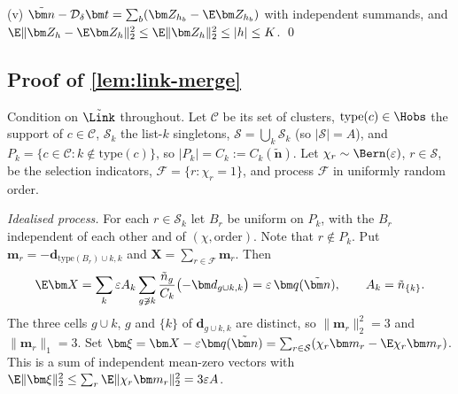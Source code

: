 (v) $\tilde{\bm n}-\mathcal D_\delta\bm t=\sum_b(\bm Z_{h_b}-\E\bm Z_{h_b})$ with independent summands, and $\E\|\bm Z_h-\E\bm Z_h\|_2^2\le\E\|\bm Z_h\|_2^2\le|h|\le K$. \qed

\subsection{Proof of \texorpdfstring{\cref{lem:link-merge}}{the merging lemma}}\label{app:link-merge}

Condition on $\tilde\Link$ throughout. Let $\mathcal C$ be its set of clusters, $\mathrm{type}(c)\in\Hobs$ the support of $c\in\mathcal C$, $\mathcal S_k$ the list-$k$ singletons, $\mathcal S=\bigcup_k\mathcal S_k$ (so $|\mathcal S|=A$), and $P_k=\{c\in\mathcal C:k\notin\mathrm{type}(c)\}$, so $|P_k|=C_k:=C_k(\tilde{\bm n})$. Let $\chi_r\sim\Bern(\varepsilon)$, $r\in\mathcal S$, be the selection indicators, $\mathcal F=\{r:\chi_r=1\}$, and process $\mathcal F$ in uniformly random order.

\emph{Idealised process.} For each $r\in\mathcal S_k$ let $B_r$ be uniform on $P_k$, with the $B_r$ independent of each other and of $(\chi,\text{order})$. Note that $r\notin P_k$. Put $\bm m_r=-\bm d_{\mathrm{type}(B_r)\cup k,k}$ and $\bm X=\sum_{r\in\mathcal F}\bm m_r$. Then
\[
  \E\bm X=\sum_k\varepsilon A_k\sum_{g\not\ni k}\frac{\tilde n_g}{C_k}\bigl(-\bm d_{g\cup k,k}\bigr)=\varepsilon\,\bm q(\tilde{\bm n}),
  \qquad A_k=\tilde n_{\{k\}} .
\]
The three cells $g\cup k$, $g$ and $\{k\}$ of $\bm d_{g\cup k,k}$ are distinct, so $\|\bm m_r\|_2^2=3$ and $\|\bm m_r\|_1=3$. Set $\bm\xi=\bm X-\varepsilon\bm q(\tilde{\bm n})=\sum_{r\in\mathcal S}(\chi_r\bm m_r-\E\chi_r\bm m_r)$. This is a sum of independent mean-zero vectors with $\E\|\bm\xi\|_2^2\le\sum_r\E\|\chi_r\bm m_r\|_2^2=3\varepsilon A$.

